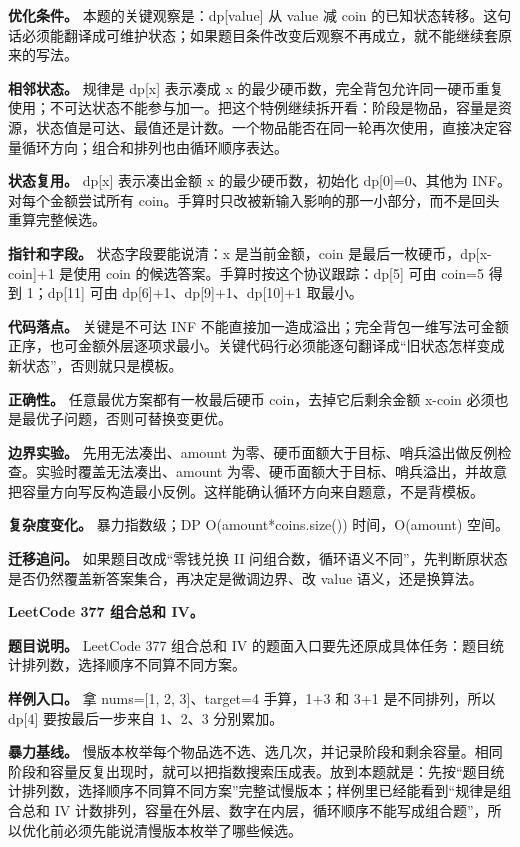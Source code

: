\textbf{优化条件。} 本题的关键观察是：dp[value] 从 value 减 coin 的已知状态转移。这句话必须能翻译成可维护状态；如果题目条件改变后观察不再成立，就不能继续套原来的写法。

\textbf{相邻状态。} 规律是 dp[x] 表示凑成 x 的最少硬币数，完全背包允许同一硬币重复使用；不可达状态不能参与加一。把这个特例继续拆开看：阶段是物品，容量是资源，状态值是可达、最值还是计数。一个物品能否在同一轮再次使用，直接决定容量循环方向；组合和排列也由循环顺序表达。

\textbf{状态复用。} dp[x] 表示凑出金额 x 的最少硬币数，初始化 dp[0]=0、其他为 INF。对每个金额尝试所有 coin。手算时只改被新输入影响的那一小部分，而不是回头重算完整候选。

\textbf{指针和字段。} 状态字段要能说清：x 是当前金额，coin 是最后一枚硬币，dp[x-coin]+1 是使用 coin 的候选答案。手算时按这个协议跟踪：dp[5] 可由 coin=5 得到 1；dp[11] 可由 dp[6]+1、dp[9]+1、dp[10]+1 取最小。

\textbf{代码落点。} 关键是不可达 INF 不能直接加一造成溢出；完全背包一维写法可金额正序，也可金额外层逐项求最小。关键代码行必须能逐句翻译成“旧状态怎样变成新状态”，否则就只是模板。

\textbf{正确性。} 任意最优方案都有一枚最后硬币 coin，去掉它后剩余金额 x-coin 必须也是最优子问题，否则可替换变更优。

\textbf{边界实验。} 先用无法凑出、amount 为零、硬币面额大于目标、哨兵溢出做反例检查。实验时覆盖无法凑出、amount 为零、硬币面额大于目标、哨兵溢出，并故意把容量方向写反构造最小反例。这样能确认循环方向来自题意，不是背模板。

\textbf{复杂度变化。} 暴力指数级；DP O(amount*coins.size()) 时间，O(amount) 空间。

\textbf{迁移追问。} 如果题目改成“零钱兑换 II 问组合数，循环语义不同”，先判断原状态是否仍然覆盖新答案集合，再决定是微调边界、改 value 语义，还是换算法。

\noindent\textbf{LeetCode 377 组合总和 IV。}

\textbf{题目说明。} LeetCode 377 组合总和 IV 的题面入口要先还原成具体任务：题目统计排列数，选择顺序不同算不同方案。

\textbf{样例入口。} 拿 nums=[1, 2, 3]、target=4 手算，1+3 和 3+1 是不同排列，所以 dp[4] 要按最后一步来自 1、2、3 分别累加。

\textbf{暴力基线。} 慢版本枚举每个物品选不选、选几次，并记录阶段和剩余容量。相同阶段和容量反复出现时，就可以把指数搜索压成表。放到本题就是：先按“题目统计排列数，选择顺序不同算不同方案”完整试慢版本；样例里已经能看到“规律是组合总和 IV 计数排列，容量在外层、数字在内层，循环顺序不能写成组合题”，所以优化前必须先能说清慢版本枚举了哪些候选。

